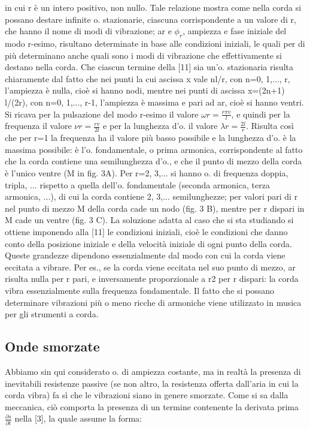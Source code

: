 \documentclass[a4paper]{article}
\begin{document}
in cui r è un intero positivo, non nullo. Tale relazione mostra come nella corda si possano destare infinite o. stazionarie, ciascuna corrispondente a un valore di r, che hanno il nome di modi di vibrazione; ar e $\phi_r$, ampiezza e fase iniziale del modo r-esimo, risultano determinate in base alle condizioni iniziali, le quali per di più determinano anche quali sono i modi di vibrazione che effettivamente si destano nella corda. Che ciascun termine della [11] sia un’o. stazionaria risulta chiaramente dal fatto che nei punti la cui ascissa x vale nl/r, con n=0, 1,..., r, l’ampiezza è nulla, cioè si hanno nodi, mentre nei punti di ascissa x=(2n+1) l/(2r), con n=0, 1,..., r-1, l’ampiezza è massima e pari ad ar, cioè si hanno ventri. Si ricava per la pulsazione del modo r-esimo il valore $\omega r=\frac{r\pi v}{l}$, e quindi per la frequenza il valore $\nu r=\frac{rv}{2l}$ e per la lunghezza d’o. il valore $\lambda r=\frac{2l}{r}$. 
Risulta così che per r=1 la frequenza ha il valore più basso possibile e la lunghezza d’o. è la massima possibile: è l’o. fondamentale, o prima armonica, corrispondente al fatto che la corda contiene una semilunghezza d’o., e che il punto di mezzo della corda è l’unico ventre (M in fig. 3A). Per r=2, 3,... si hanno o. di frequenza doppia, tripla, ... rispetto a quella dell’o. fondamentale (seconda armonica, terza armonica, ...), di cui la corda contiene 2, 3,... semilunghezze; per valori pari di r nel punto di mezzo M della corda cade un nodo (fig. 3 B), mentre per r dispari in M cade un ventre (fig. 3 C). La soluzione adatta al caso che si sta studiando si ottiene imponendo alla [11] le condizioni iniziali, cioè le condizioni che danno conto della posizione iniziale e della velocità iniziale di ogni punto della corda. Queste grandezze dipendono essenzialmente dal modo con cui la corda viene eccitata a vibrare. Per es., se la corda viene eccitata nel suo punto di mezzo, ar risulta nulla per r pari, e inversamente proporzionale a r2 per r dispari: la corda vibra essenzialmente sulla frequenza fondamentale. Il fatto che si possano determinare vibrazioni più o meno ricche di armoniche viene utilizzato in musica per gli strumenti a corda. 

\subsection{Onde smorzate} 
Abbiamo sin qui considerato o. di ampiezza costante, ma in realtà la presenza di inevitabili resistenze passive (se non altro, la resistenza offerta dall’aria in cui la corda vibra) fa sì che le vibrazioni siano in genere smorzate. Come si sa dalla meccanica, ciò comporta la presenza di un termine contenente la derivata prima $\frac{\partial s}{\partial t}$ nella [3], la quale assume la forma: 
\end{document}
